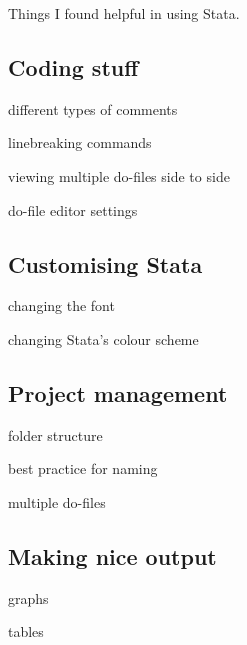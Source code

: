 Things I found helpful in using Stata.

\subsection{Coding stuff}

different types of comments

linebreaking commands

viewing multiple do-files side to side

do-file editor settings

\subsection{Customising Stata}

changing the font

changing Stata's colour scheme

\subsection{Project management}

folder structure

best practice for naming

multiple do-files

\subsection{Making nice output}

graphs

tables
